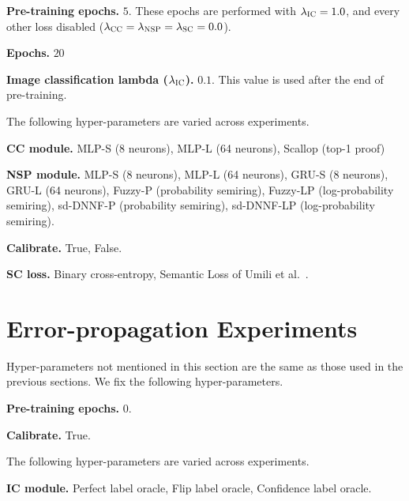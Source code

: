 \noindent\textbf{Pre-training epochs.} $5$. These epochs are performed with $\lambda_\textsc{IC} = 1.0$, and every other loss disabled ($\lambda_\textsc{CC} = \lambda_\textsc{NSP} = \lambda_\textsc{SC} = 0.0$).

\noindent\textbf{Epochs.} $20$

\noindent\textbf{Image classification lambda ($\lambda_\textsc{IC}$).} $0.1$. This value is used after the end of pre-training.


The following hyper-parameters are varied across experiments.

\noindent\textbf{\textsc{CC} module.} MLP-S (8 neurons), MLP-L (64 neurons), Scallop (top-1 proof)

\noindent\textbf{\textsc{NSP} module.} MLP-S (8 neurons), MLP-L (64 neurons), GRU-S (8 neurons), GRU-L (64 neurons), Fuzzy-P (probability semiring), Fuzzy-LP (log-probability semiring), sd-DNNF-P (probability semiring), sd-DNNF-LP (log-probability semiring).

\noindent\textbf{Calibrate.} True, False.

\noindent\textbf{\textsc{SC} loss.} Binary cross-entropy, Semantic Loss of Umili et al.~\cite{umili2023grounding}. %
%




\section{Error-propagation Experiments}\label{app:abla}
Hyper-parameters not mentioned in this section are the same as those used in the previous sections.
We fix the following hyper-parameters.

\noindent\textbf{Pre-training epochs.} $0$.

\noindent\textbf{Calibrate.} True.

The following hyper-parameters are varied across experiments.

\noindent\textbf{\textsc{IC} module.} Perfect label oracle, Flip label oracle, Confidence label oracle.

